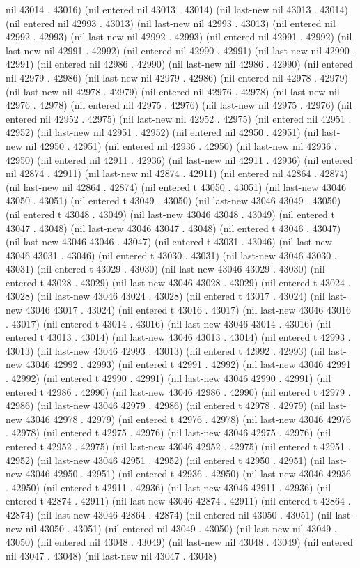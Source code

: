 nil 43014 . 43016) (nil entered nil 43013 . 43014) (nil last-new nil 43013 . 43014) (nil entered nil 42993 . 43013) (nil last-new nil 42993 . 43013) (nil entered nil 42992 . 42993) (nil last-new nil 42992 . 42993) (nil entered nil 42991 . 42992) (nil last-new nil 42991 . 42992) (nil entered nil 42990 . 42991) (nil last-new nil 42990 . 42991) (nil entered nil 42986 . 42990) (nil last-new nil 42986 . 42990) (nil entered nil 42979 . 42986) (nil last-new nil 42979 . 42986) (nil entered nil 42978 . 42979) (nil last-new nil 42978 . 42979) (nil entered nil 42976 . 42978) (nil last-new nil 42976 . 42978) (nil entered nil 42975 . 42976) (nil last-new nil 42975 . 42976) (nil entered nil 42952 . 42975) (nil last-new nil 42952 . 42975) (nil entered nil 42951 . 42952) (nil last-new nil 42951 . 42952) (nil entered nil 42950 . 42951) (nil last-new nil 42950 . 42951) (nil entered nil 42936 . 42950) (nil last-new nil 42936 . 42950) (nil entered nil 42911 . 42936) (nil last-new nil 42911 . 42936) (nil entered nil 42874 . 42911) (nil last-new nil 42874 . 42911) (nil entered nil 42864 . 42874) (nil last-new nil 42864 . 42874) (nil entered t 43050 . 43051) (nil last-new 43046 43050 . 43051) (nil entered t 43049 . 43050) (nil last-new 43046 43049 . 43050) (nil entered t 43048 . 43049) (nil last-new 43046 43048 . 43049) (nil entered t 43047 . 43048) (nil last-new 43046 43047 . 43048) (nil entered t 43046 . 43047) (nil last-new 43046 43046 . 43047) (nil entered t 43031 . 43046) (nil last-new 43046 43031 . 43046) (nil entered t 43030 . 43031) (nil last-new 43046 43030 . 43031) (nil entered t 43029 . 43030) (nil last-new 43046 43029 . 43030) (nil entered t 43028 . 43029) (nil last-new 43046 43028 . 43029) (nil entered t 43024 . 43028) (nil last-new 43046 43024 . 43028) (nil entered t 43017 . 43024) (nil last-new 43046 43017 . 43024) (nil entered t 43016 . 43017) (nil last-new 43046 43016 . 43017) (nil entered t 43014 . 43016) (nil last-new 43046 43014 . 43016) (nil entered t 43013 . 43014) (nil last-new 43046 43013 . 43014) (nil entered t 42993 . 43013) (nil last-new 43046 42993 . 43013) (nil entered t 42992 . 42993) (nil last-new 43046 42992 . 42993) (nil entered t 42991 . 42992) (nil last-new 43046 42991 . 42992) (nil entered t 42990 . 42991) (nil last-new 43046 42990 . 42991) (nil entered t 42986 . 42990) (nil last-new 43046 42986 . 42990) (nil entered t 42979 . 42986) (nil last-new 43046 42979 . 42986) (nil entered t 42978 . 42979) (nil last-new 43046 42978 . 42979) (nil entered t 42976 . 42978) (nil last-new 43046 42976 . 42978) (nil entered t 42975 . 42976) (nil last-new 43046 42975 . 42976) (nil entered t 42952 . 42975) (nil last-new 43046 42952 . 42975) (nil entered t 42951 . 42952) (nil last-new 43046 42951 . 42952) (nil entered t 42950 . 42951) (nil last-new 43046 42950 . 42951) (nil entered t 42936 . 42950) (nil last-new 43046 42936 . 42950) (nil entered t 42911 . 42936) (nil last-new 43046 42911 . 42936) (nil entered t 42874 . 42911) (nil last-new 43046 42874 . 42911) (nil entered t 42864 . 42874) (nil last-new 43046 42864 . 42874) (nil entered nil 43050 . 43051) (nil last-new nil 43050 . 43051) (nil entered nil 43049 . 43050) (nil last-new nil 43049 . 43050) (nil entered nil 43048 . 43049) (nil last-new nil 43048 . 43049) (nil entered nil 43047 . 43048) (nil last-new nil 43047 . 43048) 